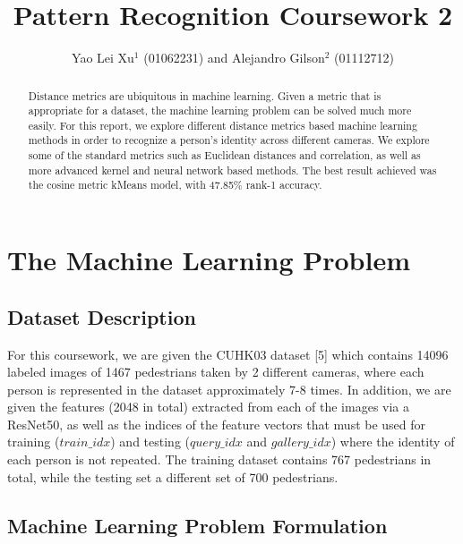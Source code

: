 \documentclass[letterpaper, 10 pt, conference]{ieeeconf}  %
\title{\LARGE \bf
Pattern Recognition Coursework 2
}
\author{Yao Lei Xu$^{1}$ (01062231) and Alejandro Gilson$^{2}$ (01112712) %
}
\begin{document}
\maketitle
\thispagestyle{empty}
\pagestyle{empty}





\begin{abstract}

    Distance metrics are ubiquitous in machine learning. Given a metric that is appropriate for a dataset, the machine learning problem can be solved much more easily. For this report, we explore different distance metrics based machine learning methods in order to recognize a person's identity across different cameras. We explore some of the standard metrics such as Euclidean distances and correlation, as well as more advanced kernel and neural network based methods. The best result achieved was the cosine metric kMeans model, with 47.85\% rank-1 accuracy. 
    
\end{abstract}

\section{The Machine Learning Problem}

\subsection{Dataset Description}

For this coursework, we are given the CUHK03 dataset [5] which contains 14096 labeled images of 1467 pedestrians taken by 2 different cameras, where each person is represented in the dataset approximately 7-8 times. In addition, we are given the features (2048 in total) extracted from each of the images via a ResNet50, as well as the indices of the feature vectors that must be used for training ($train\_idx$) and testing ($query\_idx$ and $gallery\_idx$) where the identity of each person is not repeated. The training dataset contains 767 pedestrians in total, while the testing set a different set of 700 pedestrians. 

\subsection{Machine Learning Problem Formulation}
\end{document}
